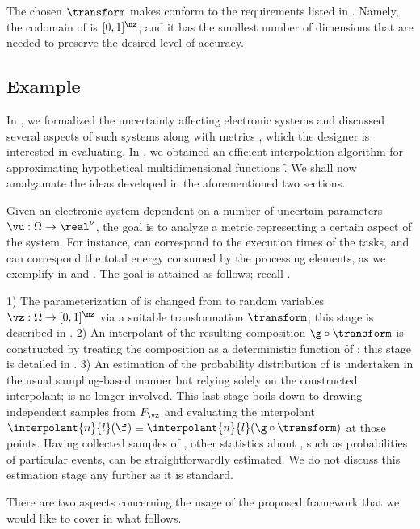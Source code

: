 The chosen $\transform$ makes \vz conform to the requirements listed in
. Namely, the codomain of \vz is $[0, 1]^\nz$,
and it has the smallest number of dimensions that are needed to preserve the
desired level of accuracy.

\subsection{Example}

In , we formalized the uncertainty affecting electronic systems
and discussed several aspects of such systems along with metrics \g, which the
designer is interested in evaluating. In , we obtained an
efficient interpolation algorithm for approximating hypothetical
multidimensional functions \f. We shall now amalgamate the ideas developed in
the aforementioned two sections.

Given an electronic system dependent on a number of uncertain parameters $\vu:
\Omega \to \real^\nu$, the goal is to analyze a metric \g representing a certain
aspect of the system. For instance, \vu can correspond to the execution times of
the tasks, and \g can correspond the total energy consumed by the processing
elements, as we exemplify in  and . The goal is attained
as follows; recall .

1) The parameterization of \g is changed from \vu to random variables $\vz:
\Omega \to [0, 1]^\nz$ via a suitable transformation $\transform$; this stage is
described in . 2) An interpolant of the resulting composition
$\g \circ \transform$ is constructed by treating the composition as a
deterministic function \f of \vz; this stage is detailed in
. 3) An estimation of the probability distribution of \g is
undertaken in the usual sampling-based manner but relying solely on the
constructed interpolant; \g is no longer involved. This last stage boils down to
drawing independent samples from $F_{\vz}$ and evaluating the interpolant
$\interpolant{n}{l}(\f) \equiv \interpolant{n}{l}(\g \circ \transform)$ at those
points. Having collected samples of \g, other statistics about \g, such as
probabilities of particular events, can be straightforwardly estimated. We do
not discuss this estimation stage any further as it is standard.

There are two aspects concerning the usage of the proposed framework that we
would like to cover in what follows.

